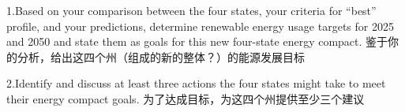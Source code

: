 1.Based on your comparison between the four states, your criteria for “best” profile, and your predictions, determine renewable energy usage targets for 2025 and 2050 and state them as goals for this new four-state energy compact.  
鉴于你的分析，给出这四个州（组成的新的整体？）的能源发展目标

 2.Identify and discuss at least three actions the four states might take to meet their energy compact goals. 
 为了达成目标，为这四个州提供至少三个建议

 \subsection{}
 \subsection{}